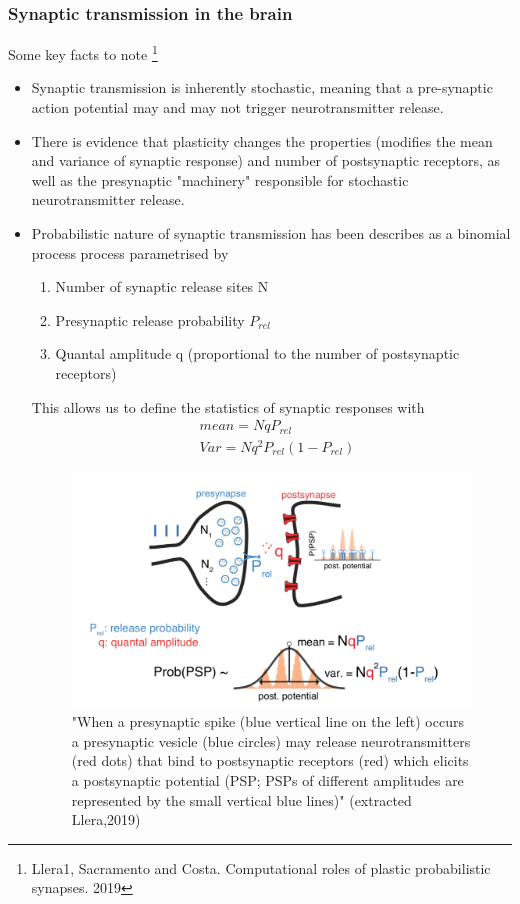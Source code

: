 \documentclass[main]{subfiles}
\begin{document}
\subsubsection{Synaptic transmission in the brain}
Some key facts to note \footnote{Llera1, Sacramento and Costa. Computational roles of plastic probabilistic synapses. 2019}
\begin{itemize}
    \item Synaptic transmission is inherently stochastic, meaning that a pre-synaptic action potential may and may not trigger neurotransmitter release.
    \item There is evidence that plasticity changes the properties (modifies the mean and variance of 
    synaptic response) and number of postsynaptic receptors, as well as the presynaptic "machinery" responsible for stochastic neurotransmitter release.
    \item Probabilistic nature of synaptic transmission has been describes as a binomial process process parametrised by
        \begin{enumerate}
            \item Number of synaptic release sites N
            \item Presynaptic release probability $P_{rel}$
            \item Quantal amplitude q (proportional to the number of postsynaptic receptors)
        \end{enumerate}
    This allows us to define the statistics of synaptic responses with
    \begin{equation}
        \begin{split}
            & mean = N q P_{rel}\\
            & Var = N q^2 P_{rel} (1-P_{rel})
        \end{split}
    \end{equation}
 
    \begin{figure}[H]
    	\centering
    	\includegraphics[width=0.9\linewidth]{05_LearningAsBayesianInference/figures/synaptic_tx_model.png}
    	\caption{"When a presynaptic spike (blue vertical line on the left) occurs a presynaptic vesicle (blue circles) may release neurotransmitters (red dots) that bind to postsynaptic receptors (red) which elicits a postsynaptic potential (PSP; PSPs of different amplitudes are represented by the small vertical blue lines)" (extracted Llera,2019)} 
    	\label{fig:synaptic_tx}
    \end{figure}
    

\end{itemize}
\end{document}
